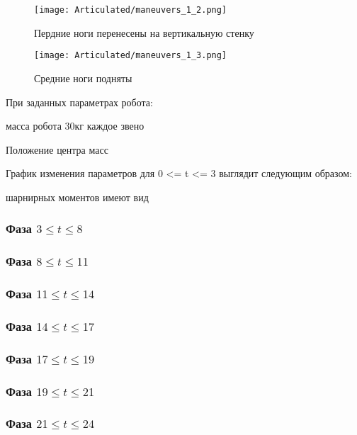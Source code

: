 \begin{figure}[ht]
  \centering
  \texttt{[image: Articulated/maneuvers\_1\_2.png]}
  \caption{Пердние ноги перенесены на вертикальную стенку}
\end{figure}

\begin{figure}[ht]
  \centering
  \texttt{[image: Articulated/maneuvers\_1\_3.png]}
  \caption{Средние ноги подняты}
\end{figure}

При заданных параметрах робота:

масса робота 30кг каждое звено 

Положение центра масс 

График изменения параметров  для 0 <= t <= 3 выглядит следующим образом:




 шарнирных моментов имеют вид



\subsubsection{Фаза $3 \leq t \leq 8$}


\subsubsection{Фаза $8 \leq t \leq 11$}

\subsubsection{Фаза $11 \leq t \leq 14$}

\subsubsection{Фаза $14 \leq t \leq 17$}

\subsubsection{Фаза $17 \leq t \leq 19$}

\subsubsection{Фаза $19 \leq t \leq 21$}

\subsubsection{Фаза $21 \leq t \leq 24$}

